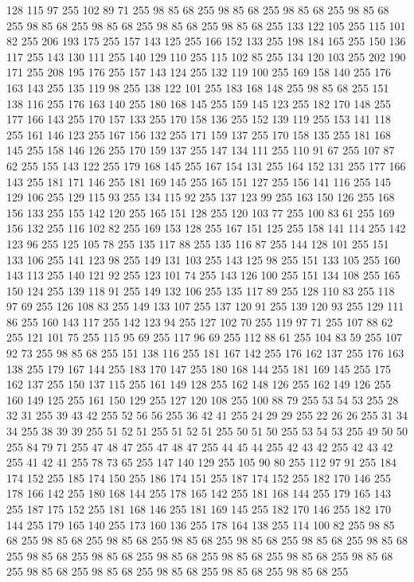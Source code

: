 128 115 97 255 102 89 71 255 98 85 68 255 98 85 68 255 98 85 68 255 98 85 68 255 98 85 68 255 98 85 68 255 98 85 68 255 98 85 68 255 133 122 105 255 115 101 82 255 206 193 175 255 157 143 125 255 166 152 133 255 198 184 165 255 150 136 117 255 143 130 111 255 140 129 110 255 115 102 85 255 134 120 103 255 202 190 171 255 208 195 176 255 157 143 124 255 132 119 100 255 169 158 140 255 176 163 143 255 135 119 98 255 138 122 101 255 183 168 148 255 98 85 68 255 151 138 116 255 176 163 140 255 180 168 145 255 159 145 123 255 182 170 148 255 177 166 143 255 170 157 133 255 170 158 136 255 152 139 119 255 153 141 118 255 161 146 123 255 167 156 132 255 171 159 137 255 170 158 135 255 181 168 145 255 158 146 126 255 170 159 137 255 147 134 111 255 110 91 67 255 107 87 62 255 155 143 122 255 179 168 145 255 167 154 131 255 164 152 131 255 177 166 143 255 181 171 146 255 181 169 145 255 165 151 127 255 156 141 116 255 145 129 106 255 129 115 93 255 134 115 92 255 137 123 99 255
163 150 126 255 168 156 133 255 155 142 120 255 165 151 128 255 120 103 77 255 100 83 61 255 169 156 132 255 116 102 82 255 169 153 128 255 167 151 125 255 158 141 114 255 142 123 96 255 125 105 78 255 135 117 88 255 135 116 87 255 144 128 101 255 151 133 106 255 141 123 98 255 149 131 103 255 143 125 98 255 151 133 105 255 160 143 113 255 140 121 92 255 123 101 74 255 143 126 100 255 151 134 108 255 165 150 124 255 139 118 91 255 149 132 106 255 135 117 89 255 128 110 83 255 118 97 69 255 126 108 83 255 149 133 107 255 137 120 91 255 139 120 93 255 129 111 86 255 160 143 117 255 142 123 94 255 127 102 70 255 119 97 71 255 107 88 62 255 121 101 75 255 115 95 69 255 117 96 69 255 112 88 61 255 104 83 59 255 107 92 73 255 98 85 68 255 151 138 116 255 181 167 142 255 176 162 137 255 176 163 138 255 179 167 144 255 183 170 147 255 180 168 144 255 181 169 145 255 175 162 137 255 150 137 115 255 161 149 128 255 162 148 126 255 162 149 126 255 160 149 125 255 161 150 129 255
127 120 108 255 100 88 79 255 53 54 53 255 28 32 31 255 39 43 42 255 52 56 56 255 36 42 41 255 24 29 29 255 22 26 26 255 31 34 34 255 38 39 39 255 51 52 51 255 51 52 51 255 50 51 50 255 53 54 53 255 49 50 50 255 84 79 71 255 47 48 47 255 47 48 47 255 44 45 44 255 42 43 42 255 42 43 42 255 41 42 41 255 78 73 65 255 147 140 129 255 105 90 80 255 112 97 91 255 184 174 152 255 185 174 150 255 186 174 151 255 187 174 152 255 182 170 146 255 178 166 142 255 180 168 144 255 178 165 142 255 181 168 144 255 179 165 143 255 187 175 152 255 181 168 146 255 181 169 145 255 182 170 146 255 182 170 144 255 179 165 140 255 173 160 136 255 178 164 138 255 114 100 82 255 98 85 68 255 98 85 68 255 98 85 68 255 98 85 68 255 98 85 68 255 98 85 68 255 98 85 68 255 98 85 68 255 98 85 68 255 98 85 68 255 98 85 68 255 98 85 68 255 98 85 68 255 98 85 68 255 98 85 68 255 98 85 68 255 98 85 68 255 98 85 68 255

